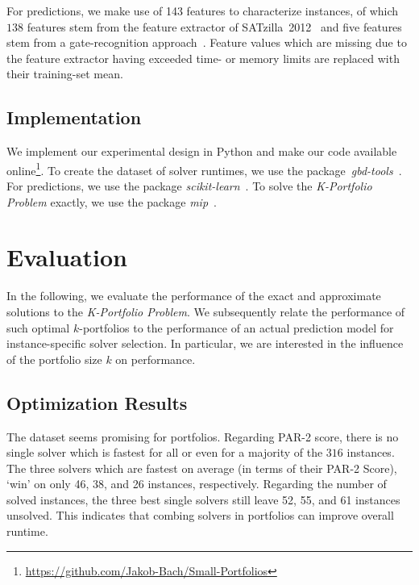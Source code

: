 \documentclass[conference]{IEEEtran}
\begin{document}
For predictions, we make use of 143 features to characterize instances, of which 
$138$ features stem from the feature extractor of SATzilla~2012~\cite{xu2008satzilla, xu2012satzilla2012} and five features stem from a gate-recognition approach~\cite{Iser:2015:GateRecognition}. 
Feature values which are missing due to the feature extractor having exceeded time- or memory limits are replaced with their training-set mean. 

\subsection{Implementation}

We implement our experimental design in Python and make our code available online\footnote{\url{https://github.com/Jakob-Bach/Small-Portfolios}}.
To create the dataset of solver runtimes, we use the package~\emph{gbd-tools}~\cite{iser2020collaborative}.
For predictions, we use the package \emph{scikit-learn}~\cite{scikit-learn}.
To solve the \emph{K-Portfolio Problem} exactly, we use the package \emph{mip}~\cite{python-mip}.

\section{Evaluation}
\label{sec:evaluation}

In the following, we evaluate the performance of the exact and approximate solutions to the \emph{K-Portfolio Problem}. 
We subsequently relate the performance of such optimal $k$-portfolios to the performance of an actual prediction model for instance-specific solver selection. 
In particular, we are interested in the influence of the portfolio size $k$ on performance. 

\subsection{Optimization Results}

The dataset seems promising for portfolios.
Regarding \mbox{PAR-2} score, there is no single solver which is fastest for all or even for a majority of the $316$ instances. 
The three solvers which are fastest on average (in terms of their PAR-2 Score), `win' on only 46, 38, and 26 instances, respectively. 
Regarding the number of solved instances, the three best single solvers still leave 52, 55, and 61 instances unsolved. 
This indicates that combing solvers in portfolios can improve overall runtime.
\end{document}
